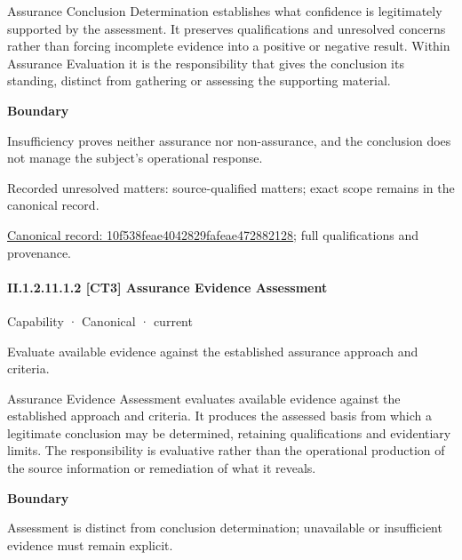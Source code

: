 Assurance Conclusion Determination establishes what confidence is legitimately supported by the assessment. It preserves qualifications and unresolved concerns rather than forcing incomplete evidence into a positive or negative result. Within Assurance Evaluation it is the responsibility that gives the conclusion its standing, distinct from gathering or assessing the supporting material.



\textbf{Boundary}



Insufficiency proves neither assurance nor non-assurance, and the conclusion does not manage the subject's operational response.


{\small Recorded unresolved matters: source-qualified matters; exact scope remains in the canonical record.}\par
{\footnotesize \href{../../../../../../../continuum/strategy/capability/10f538feae4042829fafeae472882128.md}{Canonical record: 10f538feae4042829fafeae472882128}; full qualifications and provenance.}\par
\paragraph*{II.1.2.11.1.2 [CT3] Assurance Evidence Assessment}
\label{navigation:II.1.2.11.1.2}

\label{element:1b295763b37f4622bd1bb80c6ea3741c}
{\small Capability · Canonical · current}\par

Evaluate available evidence against the established assurance approach and criteria.



Assurance Evidence Assessment evaluates available evidence against the established approach and criteria. It produces the assessed basis from which a legitimate conclusion may be determined, retaining qualifications and evidentiary limits. The responsibility is evaluative rather than the operational production of the source information or remediation of what it reveals.



\textbf{Boundary}



Assessment is distinct from conclusion determination; unavailable or insufficient evidence must remain explicit.


